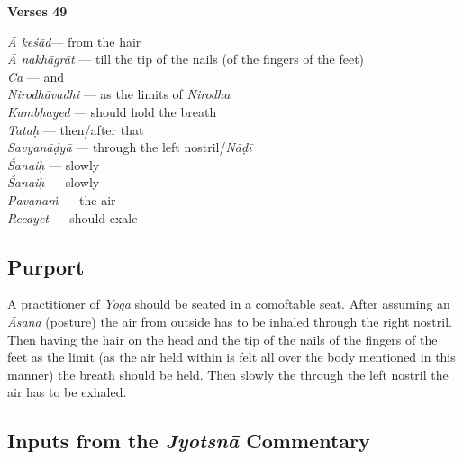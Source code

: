 \noindent \textbf{Verses 49}

\begin{multicols}{2}
\textit{Ā  keśād}--- from the hair \\
\textit{Ā nakhāgrāt} --- till the tip of the nails (of the fingers of the feet) \\
\textit{Ca}  --- and \\
\textit{Nirodhāvadhi} --- as the limits of \textit{Nirodha} \\
\textit{Kumbhayed} --- should hold the breath\\
\textit{Tataḥ} --- then/after that \\
\textit{Savyanāḍyā} --- through the left nostril/\textit{Nāḍī} \\
\textit{Śanaiḥ} --- slowly \\
\textit{Śanaiḥ} --- slowly \\
\textit{Pavanaṁ} --- the air \\
\textit{Recayet} --- should exale 
\end{multicols}

\subsection*{Purport}

A practitioner of \textit{Yoga} should be seated in a comoftable seat. After assuming an \textit{Āsana} (posture) the air from outside has to be inhaled through the right nostril.  Then having the hair on the head and the tip of the nails of the fingers of the feet as the limit (as the air held within is felt all over the body mentioned in this manner) the breath should be held. Then slowly the through the left nostril the air has to be exhaled. 

\subsection*{Inputs from the \textit{Jyotsnā} Commentary}

